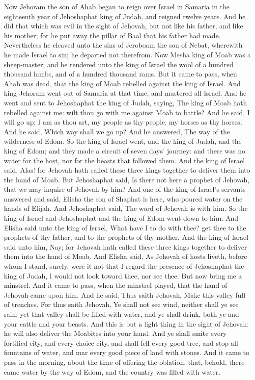 Now Jehoram the son of Ahab began to reign over Israel in Samaria in the eighteenth year of Jehoshaphat king of Judah, and reigned twelve years. And he did that which was evil in the sight of Jehovah, but not like his father, and like his mother; for he put away the pillar of Baal that his father had made. Nevertheless he cleaved unto the sins of Jeroboam the son of Nebat, wherewith he made Israel to sin; he departed not therefrom.  Now Mesha king of Moab was a sheep-master; and he rendered unto the king of Israel the wool of a hundred thousand lambs, and of a hundred thousand rams. But it came to pass, when Ahab was dead, that the king of Moab rebelled against the king of Israel. And king Jehoram went out of Samaria at that time, and mustered all Israel. And he went and sent to Jehoshaphat the king of Judah, saying, The king of Moab hath rebelled against me: wilt thou go with me against Moab to battle? And he said, I will go up: I am as thou art, my people as thy people, my horses as thy horses. And he said, Which way shall we go up? And he answered, The way of the wilderness of Edom. So the king of Israel went, and the king of Judah, and the king of Edom; and they made a circuit of seven days’ journey: and there was no water for the host, nor for the beasts that followed them. And the king of Israel said, Alas! for Jehovah hath called these three kings together to deliver them into the hand of Moab. But Jehoshaphat said, Is there not here a prophet of Jehovah, that we may inquire of Jehovah by him? And one of the king of Israel’s servants answered and said, Elisha the son of Shaphat is here, who poured water on the hands of Elijah. And Jehoshaphat said, The word of Jehovah is with him. So the king of Israel and Jehoshaphat and the king of Edom went down to him.  And Elisha said unto the king of Israel, What have I to do with thee? get thee to the prophets of thy father, and to the prophets of thy mother. And the king of Israel said unto him, Nay; for Jehovah hath called these three kings together to deliver them into the hand of Moab. And Elisha said, As Jehovah of hosts liveth, before whom I stand, surely, were it not that I regard the presence of Jehoshaphat the king of Judah, I would not look toward thee, nor see thee. But now bring me a minstrel. And it came to pass, when the minstrel played, that the hand of Jehovah came upon him. And he said, Thus saith Jehovah, Make this valley full of trenches. For thus saith Jehovah, Ye shall not see wind, neither shall ye see rain; yet that valley shall be filled with water, and ye shall drink, both ye and your cattle and your beasts. And this is but a light thing in the sight of Jehovah: he will also deliver the Moabites into your hand. And ye shall smite every fortified city, and every choice city, and shall fell every good tree, and stop all fountains of water, and mar every good piece of land with stones. And it came to pass in the morning, about the time of offering the oblation, that, behold, there came water by the way of Edom, and the country was filled with water. 